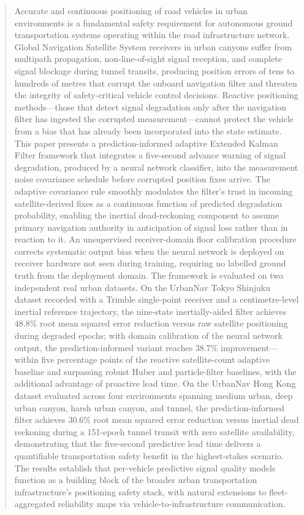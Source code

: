 \documentclass[journal]{IEEEtran}
\begin{document}
\begin{abstract}
Accurate and continuous positioning of road vehicles in urban environments is
a fundamental safety requirement for autonomous ground transportation systems
operating within the road infrastructure network.  Global Navigation Satellite
System receivers in urban canyons suffer from multipath propagation,
non-line-of-sight signal reception, and complete signal blockage during tunnel
transits, producing position errors of tens to hundreds of metres that corrupt
the onboard navigation filter and threaten the integrity of safety-critical
vehicle control decisions.  Reactive positioning methods---those that detect
signal degradation only after the navigation filter has ingested the corrupted
measurement---cannot protect the vehicle from a bias that has already been
incorporated into the state estimate.  This paper presents a
prediction-informed adaptive Extended Kalman Filter framework that integrates
a five-second advance warning of signal degradation, produced by a neural
network classifier, into the measurement noise covariance schedule before
corrupted position fixes arrive.  The adaptive covariance rule smoothly
modulates the filter's trust in incoming satellite-derived fixes as a
continuous function of predicted degradation probability, enabling the
inertial dead-reckoning component to assume primary navigation authority in
anticipation of signal loss rather than in reaction to it.  An unsupervised
receiver-domain floor calibration procedure corrects systematic output bias
when the neural network is deployed on receiver hardware not seen during
training, requiring no labelled ground truth from the deployment domain.  The
framework is evaluated on two independent real urban datasets.  On the
UrbanNav Tokyo Shinjuku dataset recorded with a Trimble single-point receiver
and a centimetre-level inertial reference trajectory, the nine-state
inertially-aided filter achieves 48.8\% root mean squared error reduction
versus raw satellite positioning during degraded epochs; with domain
calibration of the neural network output, the prediction-informed variant
reaches 38.7\% improvement---within five percentage points of the reactive
satellite-count adaptive baseline and surpassing robust Huber and particle-filter
baselines, with the additional advantage of proactive lead time.
On the UrbanNav Hong Kong dataset evaluated across four environments spanning
medium urban, deep urban canyon, harsh urban canyon, and tunnel, the
prediction-informed filter achieves 30.6\% root mean squared error reduction
versus inertial dead reckoning during a 151-epoch tunnel transit with zero
satellite availability, demonstrating that the five-second predictive lead
time delivers a quantifiable transportation safety benefit in the
highest-stakes scenario.  The results establish that per-vehicle predictive
signal quality models function as a building block of the broader urban
transportation infrastructure's positioning safety stack, with natural
extensions to fleet-aggregated reliability maps via vehicle-to-infrastructure
communication.
\end{abstract}
\end{document}
